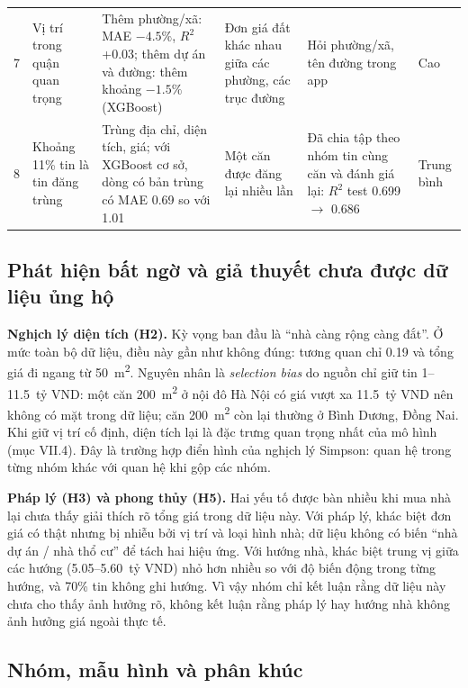 \documentclass[11pt]{article}
\newcommand{\ty}{tỷ VND}
\newcommand{\mtwo}{m\textsuperscript{2}}
\begin{document}
\begin{table}[H]
\begin{tabular}{@{}L{0.03\textwidth}L{0.17\textwidth}L{0.20\textwidth}L{0.20\textwidth}L{0.17\textwidth}L{0.08\textwidth}@{}}
7 & Vị trí trong quận quan trọng & Thêm phường/xã: MAE $-4.5\%$, $R^2$ +0.03; thêm dự án và đường: thêm khoảng $-1.5\%$ (XGBoost) & Đơn giá đất khác nhau giữa các phường, các trục đường & Hỏi phường/xã, tên đường trong app & Cao \\
8 & Khoảng 11\% tin là tin đăng trùng & Trùng địa chỉ, diện tích, giá; với XGBoost cơ sở, dòng có bản trùng có MAE 0.69 so với 1.01 & Một căn được đăng lại nhiều lần & Đã chia tập theo nhóm tin cùng căn và đánh giá lại: $R^2$ test 0.699 $\rightarrow$ 0.686 & Trung bình \\
\bottomrule
\end{tabular}
\end{table}

\subsection{Phát hiện bất ngờ và giả thuyết chưa được dữ liệu ủng hộ}

\textbf{Nghịch lý diện tích (H2).} Kỳ vọng ban đầu là ``nhà càng rộng càng đắt''. Ở mức toàn bộ dữ liệu,
điều này gần như không đúng: tương quan chỉ 0.19 và tổng giá đi ngang từ 50~\mtwo. Nguyên nhân là
\textit{selection bias} do nguồn chỉ giữ tin 1--11.5~\ty: một căn 200~\mtwo{} ở nội đô Hà Nội có giá vượt xa
11.5~\ty{} nên không có mặt trong dữ liệu; căn 200~\mtwo{} còn lại thường ở Bình Dương, Đồng Nai. Khi giữ
vị trí cố định, diện tích lại là đặc trưng quan trọng nhất của mô hình (mục VII.4). Đây là trường hợp
điển hình của nghịch lý Simpson: quan hệ trong từng nhóm khác với quan hệ khi gộp các nhóm.

\textbf{Pháp lý (H3) và phong thủy (H5).} Hai yếu tố được bàn nhiều khi mua nhà lại chưa thấy giải thích
rõ tổng giá trong dữ liệu này. Với pháp lý, khác biệt đơn giá có thật nhưng bị nhiễu bởi vị trí và loại hình
nhà; dữ liệu không có biến ``nhà dự án / nhà thổ cư'' để tách hai hiệu ứng. Với hướng nhà, khác biệt trung vị
giữa các hướng (5.05--5.60~\ty) nhỏ hơn nhiều so với độ biến động trong từng hướng, và 70\% tin không ghi hướng.
Vì vậy nhóm chỉ kết luận rằng dữ liệu này chưa cho thấy ảnh hưởng rõ, không kết luận rằng pháp lý hay hướng nhà
không ảnh hưởng giá ngoài thực tế.

\subsection{Nhóm, mẫu hình và phân khúc}
\end{document}
